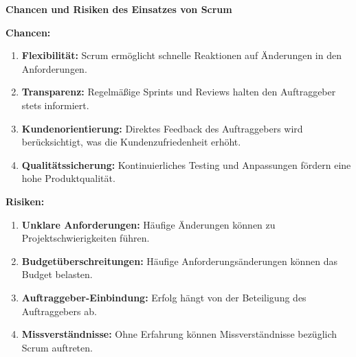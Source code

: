\documentclass[main.tex]{subfiles}
\begin{document}
   \textbf{Chancen und Risiken des Einsatzes von Scrum}

   \textbf{Chancen:}
   \begin{enumerate}
       \item \textbf{Flexibilität:} Scrum ermöglicht schnelle Reaktionen auf Änderungen in den Anforderungen.
       \item \textbf{Transparenz:} Regelmäßige Sprints und Reviews halten den Auftraggeber stets informiert.
       \item \textbf{Kundenorientierung:} Direktes Feedback des Auftraggebers wird berücksichtigt, was die Kundenzufriedenheit erhöht.
       \item \textbf{Qualitätssicherung:} Kontinuierliches Testing und Anpassungen fördern eine hohe Produktqualität.
   \end{enumerate}

   \textbf{Risiken:}
   \begin{enumerate}
       \item \textbf{Unklare Anforderungen:} Häufige Änderungen können zu Projektschwierigkeiten führen.
       \item \textbf{Budgetüberschreitungen:} Häufige Anforderungsänderungen können das Budget belasten.
       \item \textbf{Auftraggeber-Einbindung:} Erfolg hängt von der Beteiligung des Auftraggebers ab.
       \item \textbf{Missverständnisse:} Ohne Erfahrung können Missverständnisse bezüglich Scrum auftreten.
   \end{enumerate}
\end{document}
